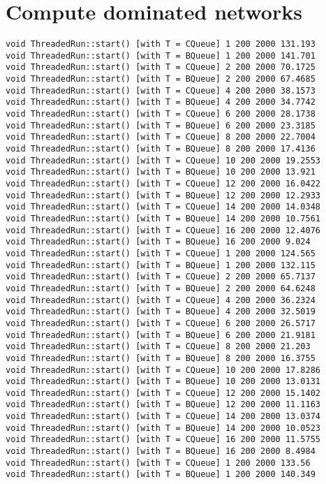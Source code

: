 \section{Compute dominated networks}
\begin{verbatim}
void ThreadedRun::start() [with T = CQueue] 1 200 2000 131.193
void ThreadedRun::start() [with T = BQueue] 1 200 2000 141.701
void ThreadedRun::start() [with T = CQueue] 2 200 2000 70.1725
void ThreadedRun::start() [with T = BQueue] 2 200 2000 67.4685
void ThreadedRun::start() [with T = CQueue] 4 200 2000 38.1573
void ThreadedRun::start() [with T = BQueue] 4 200 2000 34.7742
void ThreadedRun::start() [with T = CQueue] 6 200 2000 28.1738
void ThreadedRun::start() [with T = BQueue] 6 200 2000 23.3185
void ThreadedRun::start() [with T = CQueue] 8 200 2000 22.7004
void ThreadedRun::start() [with T = BQueue] 8 200 2000 17.4136
void ThreadedRun::start() [with T = CQueue] 10 200 2000 19.2553
void ThreadedRun::start() [with T = BQueue] 10 200 2000 13.921
void ThreadedRun::start() [with T = CQueue] 12 200 2000 16.0422
void ThreadedRun::start() [with T = BQueue] 12 200 2000 12.2933
void ThreadedRun::start() [with T = CQueue] 14 200 2000 14.0348
void ThreadedRun::start() [with T = BQueue] 14 200 2000 10.7561
void ThreadedRun::start() [with T = CQueue] 16 200 2000 12.4076
void ThreadedRun::start() [with T = BQueue] 16 200 2000 9.024
void ThreadedRun::start() [with T = CQueue] 1 200 2000 124.565
void ThreadedRun::start() [with T = BQueue] 1 200 2000 132.115
void ThreadedRun::start() [with T = CQueue] 2 200 2000 65.7137
void ThreadedRun::start() [with T = BQueue] 2 200 2000 64.6248
void ThreadedRun::start() [with T = CQueue] 4 200 2000 36.2324
void ThreadedRun::start() [with T = BQueue] 4 200 2000 32.5019
void ThreadedRun::start() [with T = CQueue] 6 200 2000 26.5717
void ThreadedRun::start() [with T = BQueue] 6 200 2000 21.9181
void ThreadedRun::start() [with T = CQueue] 8 200 2000 21.203
void ThreadedRun::start() [with T = BQueue] 8 200 2000 16.3755
void ThreadedRun::start() [with T = CQueue] 10 200 2000 17.8286
void ThreadedRun::start() [with T = BQueue] 10 200 2000 13.0131
void ThreadedRun::start() [with T = CQueue] 12 200 2000 15.1402
void ThreadedRun::start() [with T = BQueue] 12 200 2000 11.1163
void ThreadedRun::start() [with T = CQueue] 14 200 2000 13.0374
void ThreadedRun::start() [with T = BQueue] 14 200 2000 10.0523
void ThreadedRun::start() [with T = CQueue] 16 200 2000 11.5755
void ThreadedRun::start() [with T = BQueue] 16 200 2000 8.4984
void ThreadedRun::start() [with T = CQueue] 1 200 2000 133.56
void ThreadedRun::start() [with T = BQueue] 1 200 2000 140.349

\end{verbatim}
